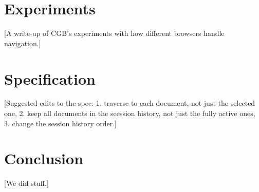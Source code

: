 \documentclass{article}
\begin{document}
\section{Experiments}

[A write-up of CGB's experiments with how different browsers handle navigation.]

\section{Specification}

[Suggested edits to the spec:
  1. traverse to each document, not just the selected one,
  2. keep all documents in the seession history, not just the fully active ones,
  3. change the session history order.]

\section{Conclusion}

[We did stuff.]
\end{document}
